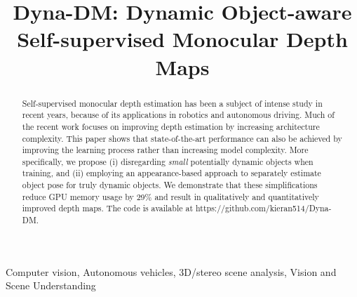 \documentclass[conference]{IEEEtran}
\begin{document}
\title{Dyna-DM: Dynamic Object-aware Self-supervised Monocular Depth Maps\\
}

 
\author{
\and
{}
\and
{}
}

\maketitle

\begin{abstract}
Self-supervised monocular depth estimation has been a subject of intense study in recent years, because of its applications in robotics and autonomous driving. Much of the recent work focuses on improving depth estimation by increasing architecture complexity.
This paper shows that state-of-the-art performance can also be achieved by improving the learning process rather than increasing model complexity.
More specifically, we propose
(i) disregarding \textit{small} potentially dynamic objects when training,
and (ii) employing an appearance-based approach to separately estimate object pose for truly dynamic objects. We demonstrate that these simplifications reduce GPU memory usage by 29\% and result in qualitatively and quantitatively improved depth maps. 
The code is available at https://github.com/kieran514/Dyna-DM.
\end{abstract}

\begin{IEEEkeywords}
 Computer vision, Autonomous vehicles, 3D/stereo scene analysis, Vision and Scene Understanding
\end{IEEEkeywords}

\IEEEpeerreviewmaketitle 
\end{document}
